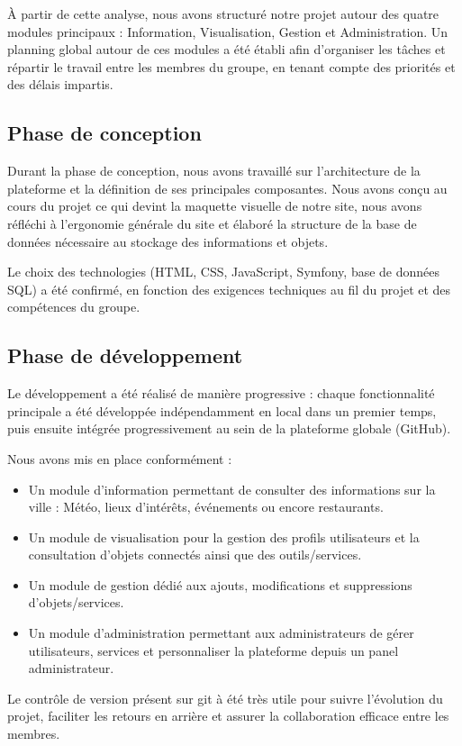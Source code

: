 \documentclass[a4paper,12pt]{report}
\begin{document}
	À partir de cette analyse, nous avons structuré notre projet autour des quatre modules principaux : Information, Visualisation, Gestion et Administration. Un planning global autour de ces modules a été établi afin d'organiser les tâches et répartir le travail entre les membres du groupe, en tenant compte des priorités et des délais impartis.
	
	\subsection{Phase de conception}
	Durant la phase de conception, nous avons travaillé sur l'architecture de la plateforme et la définition de ses principales composantes. Nous avons conçu au cours du projet ce qui devint la maquette visuelle de notre site, nous avons réfléchi à l'ergonomie générale du site et élaboré la structure de la base de données nécessaire au stockage des informations et objets.
	
	Le choix des technologies (HTML, CSS, JavaScript, Symfony, base de données SQL) a été confirmé, en fonction des exigences techniques au fil du projet et des compétences du groupe.
	
	\subsection{Phase de développement}
	Le développement a été réalisé de manière progressive : chaque fonctionnalité principale a été développée indépendamment en local dans un premier temps, puis ensuite intégrée progressivement au sein de la plateforme globale (GitHub).
	
	Nous avons mis en place conformément :
	\begin{itemize}
		\item Un module d'information permettant de consulter des informations sur la ville : Météo, lieux d'intérêts, événements ou encore restaurants.
		\item Un module de visualisation pour la gestion des profils utilisateurs et la consultation d'objets connectés ainsi que des outils/services.
		\item Un module de gestion dédié aux ajouts, modifications et suppressions d'objets/services.
		\item Un module d'administration permettant aux administrateurs de gérer utilisateurs, services et personnaliser la plateforme depuis un panel administrateur.
	\end{itemize}
	
	Le contrôle de version présent sur git à été très utile pour suivre l'évolution du projet, faciliter les retours en arrière et assurer la collaboration efficace entre les membres.
	
\end{document}
